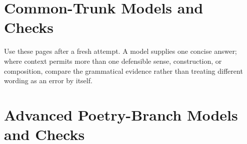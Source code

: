 \part{Common-Trunk Models and Checks}

Use these pages after a fresh attempt.  A model supplies one concise answer;
where context permits more than one defensible sense, construction, or
composition, compare the grammatical evidence rather than treating different
wording as an error by itself.


\part{Advanced Poetry-Branch Models and Checks}

